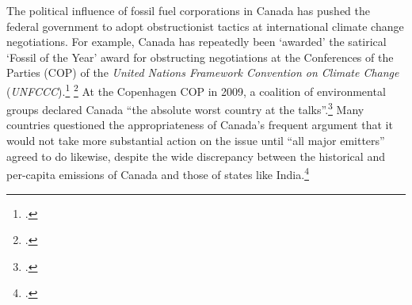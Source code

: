 \documentclass[10pt]{article}
\begin{document}
The political influence of fossil fuel corporations in Canada has pushed the federal government to adopt obstructionist tactics at international climate change negotiations.
For example, Canada has repeatedly been `awarded' the satirical `Fossil of the Year' award for obstructing negotiations at the Conferences of the Parties (COP) of the \emph{United Nations Framework Convention on Climate Change} (\emph{UNFCCC}).\footcite[][]{DurbanFossil} \footcite[See also: ][]{SimpsonBlustering}
At the Copenhagen COP in 2009, a coalition of environmental groups declared Canada ``the absolute worst country at the talks''.\footcite[][]{CBCFossil}
Many countries questioned the appropriateness of Canada's frequent argument that it would not take more substantial action on the issue until ``all major emitters'' agreed to do likewise, despite the wide discrepancy between the historical and per-capita emissions of Canada and those of states like India.\footcite[][]{CanadaWontBudge}



\end{document}
